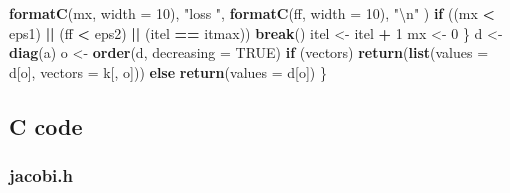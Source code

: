 \documentclass[12pt,]{article}
\newenvironment{Shaded}{\begin{snugshade}}{\end{snugshade}}
\newcommand{\KeywordTok}[1]{\textcolor[rgb]{0.13,0.29,0.53}{\textbf{#1}}}
\newcommand{\DataTypeTok}[1]{\textcolor[rgb]{0.13,0.29,0.53}{#1}}
\newcommand{\DecValTok}[1]{\textcolor[rgb]{0.00,0.00,0.81}{#1}}
\newcommand{\CharTok}[1]{\textcolor[rgb]{0.31,0.60,0.02}{#1}}
\newcommand{\StringTok}[1]{\textcolor[rgb]{0.31,0.60,0.02}{#1}}
\newcommand{\OtherTok}[1]{\textcolor[rgb]{0.56,0.35,0.01}{#1}}
\newcommand{\ControlFlowTok}[1]{\textcolor[rgb]{0.13,0.29,0.53}{\textbf{#1}}}
\newcommand{\OperatorTok}[1]{\textcolor[rgb]{0.81,0.36,0.00}{\textbf{#1}}}
\newcommand{\NormalTok}[1]{#1}
\begin{document}
\begin{Shaded}
\begin{Highlighting}[]
          \KeywordTok{formatC}\NormalTok{(mx, }\DataTypeTok{width =} \DecValTok{10}\NormalTok{),}
          \StringTok{"loss "}\NormalTok{,}
          \KeywordTok{formatC}\NormalTok{(ff, }\DataTypeTok{width =} \DecValTok{10}\NormalTok{),}
          \StringTok{"}\CharTok{\textbackslash{}n}\StringTok{"}
\NormalTok{        )}
      \ControlFlowTok{if}\NormalTok{ ((mx }\OperatorTok{<}\StringTok{ }\NormalTok{eps1) }\OperatorTok{||}\StringTok{ }\NormalTok{(ff }\OperatorTok{<}\StringTok{ }\NormalTok{eps2) }\OperatorTok{||}\StringTok{ }\NormalTok{(itel }\OperatorTok{==}\StringTok{ }\NormalTok{itmax))}
        \ControlFlowTok{break}\NormalTok{()}
\NormalTok{      itel <-}\StringTok{ }\NormalTok{itel }\OperatorTok{+}\StringTok{ }\DecValTok{1}
\NormalTok{      mx <-}\StringTok{ }\DecValTok{0}
\NormalTok{    \}}
\NormalTok{    d <-}\StringTok{ }\KeywordTok{diag}\NormalTok{(a)}
\NormalTok{    o <-}\StringTok{ }\KeywordTok{order}\NormalTok{(d, }\DataTypeTok{decreasing =} \OtherTok{TRUE}\NormalTok{)}
    \ControlFlowTok{if}\NormalTok{ (vectors)}
      \KeywordTok{return}\NormalTok{(}\KeywordTok{list}\NormalTok{(}\DataTypeTok{values =}\NormalTok{ d[o], }\DataTypeTok{vectors =}\NormalTok{ k[, o]))}
    \ControlFlowTok{else}
      \KeywordTok{return}\NormalTok{(}\DataTypeTok{values =}\NormalTok{ d[o])}
\NormalTok{  \}}
\end{Highlighting}
\end{Shaded}

\subsection{C code}\label{c-code}

\subsubsection{jacobi.h}\label{jacobi.h}
\end{document}
